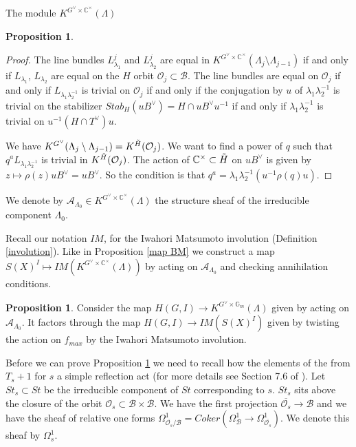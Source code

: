 \documentclass[12pt]{article}
\newcommand{\A}{\mathcal{A}}
\newcommand{\B}{\mathcal{B}}
\newcommand{\C}{\mathbb{C}}
\newcommand{\s}{\mathcal{O}}
\newcommand{\<}{\langle}
\renewcommand{\>}{\rangle}
\theoremstyle{plain}
\theoremstyle{definition}
\newtheorem{prop}[theorem]{Proposition}
\begin{document}
\begin{section}{The module $K^{G^\vee\times \C^\times}(\Lambda)$}
\begin{prop}
\end{prop}


\begin{proof}
 The line bundles $L^{j}_{\lambda_1}$ and $L^{j}_{\lambda_2}$ are equal in $K^{G^\vee\times \C^\times}(\Lambda_j\setminus\Lambda_{j-1})$ if and only if $L_{\lambda_1}$, $L_{\lambda_2}$ are equal on the $H$ orbit $\s_j\subset \B$. The line bundles are equal on $\s_j$ if and only if $L_{\lambda_1\lambda^{-1}_2}$ is trivial on $\s_j$ if and only if the conjugation by $u$ of $\lambda_1\lambda^{-1}_2$ is trivial on  the stabilizer $Stab_H(uB^\vee)=H\cap uB^\vee u^{-1}$ if and only if $\lambda_1\lambda^{-1}_2$ is trivial on $u^{-1}(H\cap T^\vee )u$.

 
We have $K^{G^\vee}(\Lambda_j\setminus\Lambda_{j-1})=K^{\Tilde{H}}(\s_j)$. We want to find a power of $q$ such that $q^aL_{\lambda_1\lambda^{-1}_2}$ is trivial in $K^{\Tilde{H}}(\s_j)$. The action of $\C^\times\subset \Tilde{H}$ on $uB^\vee$ is given by $z\mapsto \rho(z)uB^\vee=uB^\vee$. So the condition is that $q^a=\lambda_1\lambda_2^{-1}(u^{-1}\rho(q)u)$.
    
\end{proof}



We denote by $\A_{\Lambda_0}\in K^{G^\vee\times \C^\times}(\Lambda)$ the structure sheaf of the irreducible component $\Lambda_0$.

Recall our notation $IM$, for the Iwahori Matsumoto involution (Definition \ref{involution}). Like in Proposition \ref{map BM} we construct a map $S(X)^I\mapsto IM(K^{G^\vee\times \C^\times}(\Lambda))$ by acting on $\A_{\Lambda_0}$ and checking annihilation conditions.




\begin{prop}\label{map KGGm}
        Consider the map $H(G,I)\rightarrow K^{G^\vee\times \mathbb{G}_m}(\Lambda)$ given by acting on $\A_{\Lambda_0}$. It factors through the map $H(G,I)\rightarrow IM(S(X)^I)$ given by twisting the action on $f_{max}$ by the Iwahori Matsumoto involution. 
\end{prop}

Before we can prove Proposition \ref{map KGGm} we need to recall how the elements of the from $T_s+1$ for $s$ a simple reflection act (for more details see Section 7.6 of \cite{Chriss1997RepresentationTA}). Let $St_s\subset St$ be the irreducible component of $St$ corresponding to $s$. $St_s$ sits above the closure of the orbit $\s_s\subset \B\times \B$. We have the first projection $\overline{\s_s}\rightarrow \B$ and we have the sheaf of relative one forms $\Omega^1_{\overline{\s_s}/\B}=Coker(\Omega^1_{\B}\rightarrow\Omega^1_{\overline{\s_s}})$. We denote this sheaf by $\Omega^1_s$. 


\end{section}
\end{document}

